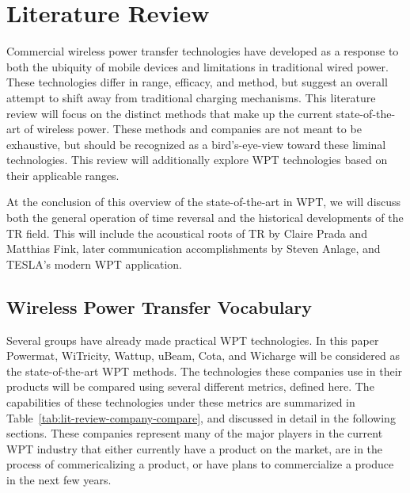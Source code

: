 \chapter{Literature Review}
\label{ch:lit-review}

Commercial wireless power transfer technologies have developed as a response to both the ubiquity of mobile devices and limitations in traditional wired power. These technologies differ in range, efficacy, and method, but suggest an overall attempt to shift away from traditional charging mechanisms. This literature review will focus on the distinct methods that make up the current state-of-the-art of wireless power. These methods and companies are not meant to be exhaustive, but should be recognized as a bird's-eye-view toward these liminal technologies. This review will additionally explore WPT technologies based on their applicable ranges.

At the conclusion of this overview of the state-of-the-art in WPT, we will discuss both the general operation of time reversal and the historical developments of the TR field. This will include the acoustical roots of TR by Claire Prada and Matthias Fink, later communication accomplishments by Steven Anlage, and TESLA's modern WPT application.

\section{Wireless Power Transfer Vocabulary}

Several groups have already made practical WPT technologies. In this paper Powermat, WiTricity, Wattup, uBeam, Cota, and Wicharge will be considered as the state-of-the-art WPT methods. The technologies these companies use in their products will be compared using several different metrics, defined here. The capabilities of these technologies under these metrics are summarized in Table~\ref{tab:lit-review-company-compare}, and discussed in detail in the following sections. These companies represent many of the major players in the current WPT industry that either currently have a product on the market, are in the process of commericalizing a product, or have plans to commercialize a produce in the next few years.

